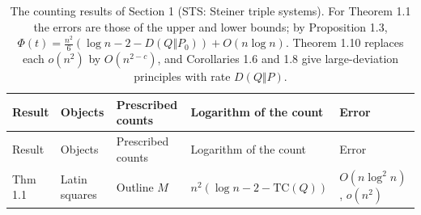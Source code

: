\documentclass[english,11pt,a4paper]{article}
\begin{document}
\begin{longtable}[]{@{}
  >{\raggedright\arraybackslash}p{}
  >{\raggedright\arraybackslash}p{}
  >{\raggedright\arraybackslash}p{}
  >{\raggedright\arraybackslash}p{}
  >{\raggedright\arraybackslash}p{}@{}}
\caption{The counting results of Section 1 (STS: Steiner triple systems). For Theorem 1.1 the errors are those of the upper and lower bounds; by Proposition 1.3, \(\Phi(t)=\tfrac{n^2}{6}(\log n-2-D(Q\Vert P_0))+O(n\log n)\). Theorem 1.10 replaces each \(o(n^2)\) by \(O(n^{2-c})\), and Corollaries 1.6 and 1.8 give large-deviation principles with rate \(D(Q\Vert P)\).}\tabularnewline
\toprule\noalign{}
\begin{minipage}[b]{\linewidth}\raggedright
Result
\end{minipage} & \begin{minipage}[b]{\linewidth}\raggedright
Objects
\end{minipage} & \begin{minipage}[b]{\linewidth}\raggedright
Prescribed counts
\end{minipage} & \begin{minipage}[b]{\linewidth}\raggedright
Logarithm of the count
\end{minipage} & \begin{minipage}[b]{\linewidth}\raggedright
Error
\end{minipage} \\
\midrule\noalign{}
\endfirsthead
\toprule\noalign{}
\begin{minipage}[b]{\linewidth}\raggedright
Result
\end{minipage} & \begin{minipage}[b]{\linewidth}\raggedright
Objects
\end{minipage} & \begin{minipage}[b]{\linewidth}\raggedright
Prescribed counts
\end{minipage} & \begin{minipage}[b]{\linewidth}\raggedright
Logarithm of the count
\end{minipage} & \begin{minipage}[b]{\linewidth}\raggedright
Error
\end{minipage} \\
\midrule\noalign{}
\endhead
\bottomrule\noalign{}
\endlastfoot
Thm 1.1 & Latin squares & Outline \(M\) & \(n^2(\log n-2-\mathrm{TC}(Q))\) & \(O(n\log^2 n)\), \(o(n^2)\) \\

\end{longtable}
\end{document}
